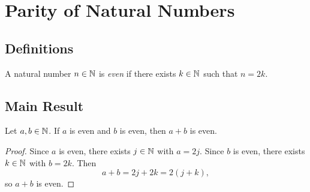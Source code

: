 
\chapter{Parity of Natural Numbers}

\section{Definitions}

\begin{definition}
  \label{def:even}
  A natural number $n \in \mathbb{N}$ is \emph{even} if there exists $k \in \mathbb{N}$
  such that $n = 2k$.
  \leanok
\end{definition}

\section{Main Result}

\begin{theorem}
  \label{thm:sum_of_evens}
  Let $a, b \in \mathbb{N}$.  If $a$ is even and $b$ is even, then $a + b$ is even.
  \leanok
\end{theorem}

\begin{proof}
  Since $a$ is even, there exists $j \in \mathbb{N}$ with $a = 2j$.
  Since $b$ is even, there exists $k \in \mathbb{N}$ with $b = 2k$.
  Then
  \[
    a + b = 2j + 2k = 2(j + k),
  \]
  so $a + b$ is even.
  \leanok
\end{proof}
